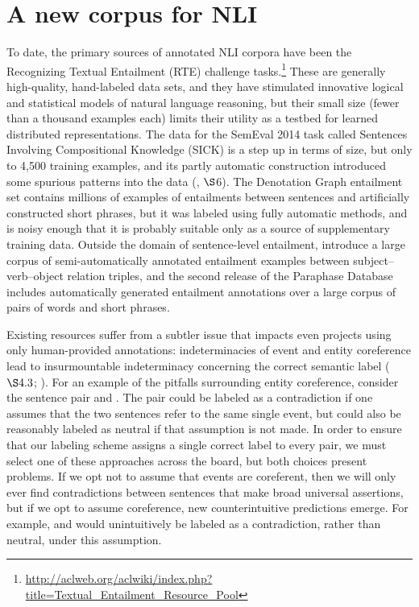 
\section{A new corpus for NLI}\label{sec:discussion}

To date, the primary sources of annotated NLI corpora have been the
Recognizing Textual Entailment (RTE)
challenge tasks.\footnote{\url{http://aclweb.org/aclwiki/index.php?title=Textual_Entailment_Resource_Pool}}
These are generally high-quality, hand-labeled data sets, and they
have stimulated innovative logical and statistical models of natural
language reasoning, but their small size (fewer than a thousand examples each)
limits their utility as a testbed for learned distributed representations. 
The data for the SemEval 2014 task called Sentences Involving Compositional Knowledge (SICK) is a step up in terms of size, but only to 4,500 training examples, and its
partly automatic construction introduced some spurious patterns into
the data (\citealt{marelli2014semeval}, $\S$6). The
Denotation Graph entailment set \cite{hodoshimage} contains millions of
examples of entailments between sentences and artificially constructed
short phrases, but it was labeled using fully automatic methods, and is
noisy enough that it is probably suitable only as a source of
supplementary training data.
Outside the domain of sentence-level entailment,  introduce
a large corpus of semi-automatically annotated entailment examples 
between subject--verb--object relation triples, and the second release of the 
Paraphase Database \cite{ganitkevitch2ppdb} includes automatically generated entailment annotations
over a large corpus of pairs of words and short phrases.

Existing resources suffer from a subtler issue that impacts even
projects using only human-provided annotations: indeterminacies of
event and entity coreference lead to insurmountable indeterminacy
concerning the correct semantic label (\citealt{de2008finding} $\S4.3$; \citealt{marelli2014sick}). 
For an example of the pitfalls surrounding entity coreference, consider the sentence pair  and . The pair could be labeled as a contradiction if one assumes that the two sentences refer to the same single event, but could also be reasonably labeled as neutral if that assumption is not made. In order to ensure that our labeling scheme assigns a single correct label to every pair, we must select one of these approaches across the board, but both choices present problems. If we opt not to assume that events are coreferent, then we will only ever find contradictions between sentences that make broad universal assertions, but if we opt to assume coreference, new counterintuitive predictions emerge. For example,  and  would unintuitively be labeled as a contradiction, rather than neutral, under this assumption.

